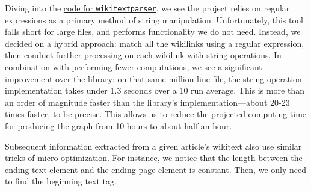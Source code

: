 \documentclass[fontsize=12pt]{article}
\newcommand{\py}[1]{\texttt{#1}}
\begin{document}
\begin{multicols}{2}
    Diving into the \href{https://github.com/5j9/wikitextparser/blob/master/wikitextparser/_wikilink.py}{code for \py{wikitextparser}}, we see the project relies on regular expressions as a primary method of string manipulation. Unfortunately, this tool falls short for large files, and performs functionality we do not need. Instead, we decided on a hybrid approach: match all the wikilinks using a regular expression, then conduct further processing on each wikilink with string operations. In combination with performing fewer computations, we see a significant improvement over the library: on that same million line file, the string operation implementation takes under 1.3 seconds over a 10 run average. This is more than an order of magnitude faster than the library's implementation---about 20-23 times faster, to be precise. This allows us to reduce the projected computing time for producing the graph from 10 hours to about half an hour.

    Subsequent information extracted from a given article's wikitext also use similar tricks of micro optimization. For instance, we notice that the length between the ending text element and the ending page element is constant. Then, we only need to find the beginning text tag. 

\end{multicols}
\end{document}
